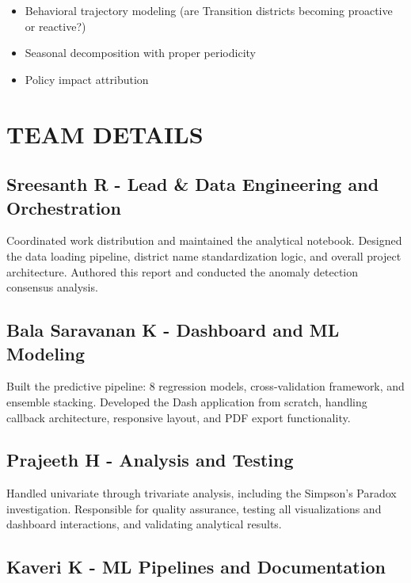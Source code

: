 \documentclass[11pt, a4paper]{article}
\begin{document}
\begin{itemize}
\item Behavioral trajectory modeling (are Transition districts becoming proactive or reactive?)

\item Seasonal decomposition with proper periodicity

\item Policy impact attribution
\end{itemize}



\section{TEAM DETAILS}

\subsection{Sreesanth R - Lead \& Data Engineering and Orchestration}

Coordinated work distribution and maintained the analytical notebook. Designed the data loading pipeline, district name standardization logic, and overall project architecture. Authored this report and conducted the anomaly detection consensus analysis.


\subsection{Bala Saravanan K - Dashboard and ML Modeling}

Built the predictive pipeline: 8 regression models, cross-validation framework, and ensemble stacking. Developed the Dash application from scratch, handling callback architecture, responsive layout, and PDF export functionality.


\subsection{Prajeeth H - Analysis and Testing}

Handled univariate through trivariate analysis, including the Simpson's Paradox investigation. Responsible for quality assurance, testing all visualizations and dashboard interactions, and validating analytical results.


\subsection{Kaveri K - ML Pipelines and Documentation}
\end{document}
